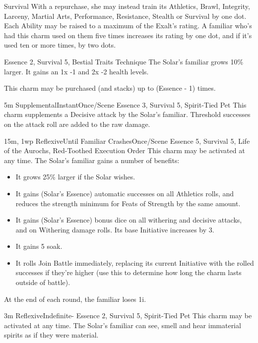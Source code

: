 \begin{Ability}{Survival}
  With a repurchase, she may instead train its Athletics, Brawl, Integrity, Larceny, Martial Arts, Performance, Resistance, Stealth or Survival by one dot. Each Ability may be raised to a maximum of the Exalt's rating. A familiar who's had this charm used on them five times increases its rating by one dot, and if it's used ten or more times, by two dots.

  {Essence 2, Survival 5, Bestial Traits Technique}
  The Solar's familiar grows 10\% larger. It gains an 1x -1 and 2x -2 health levels.

  This charm may be purchased (and stacks) up to (Essence - 1) times.

  {5m}
  {Supplemental}{Instant}{Once/Scene}
  {Essence 3, Survival 5, Spirit-Tied Pet}
  This charm supplements a Decisive attack by the Solar's familiar. Threshold successes on the attack roll are added to the raw damage.

  {15m, 1wp}
  {Reflexive}{Until Familiar Crashes}{Once/Scene}
  {Essence 5, Survival 5, Life of the Aurochs, Red-Toothed Execution Order}
  This charm may be activated at any time. The Solar's familiar gains a number of benefits:

  \begin{itemize}
    \item It grows 25\% larger if the Solar wishes.
    \item It gains (Solar's Essence) automatic successes on all Athletics rolls, and reduces the strength minimum for Feats of Strength by the same amount.
    \item It gains (Solar's Essence) bonus dice on all withering and decisive attacks, and on Withering damage rolls. Its base Initiative increases by 3.
    \item It gains 5 soak.
    \item It rolls Join Battle immediately, replacing its current Initiative with the rolled successes if they're higher (use this to determine how long the charm lasts outside of battle).
  \end{itemize}

  At the end of each round, the familiar loses 1i.

  {3m}
  {Reflexive}{Indefinite}{-}
  {Essence 2, Survival 5, Spirit-Tied Pet}
  This charm may be activated at any time. The Solar's familiar can see, smell and hear immaterial spirits as if they were material.


\end{Ability}
